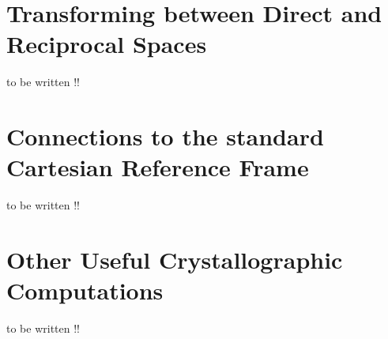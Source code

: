 \section{Transforming between Direct  and Reciprocal Spaces}

{\color{red}to be written !!}

\section{Connections to the standard Cartesian Reference Frame}

{\color{red}to be written !!}


\section{Other Useful Crystallographic Computations}

{\color{red}to be written !!}



